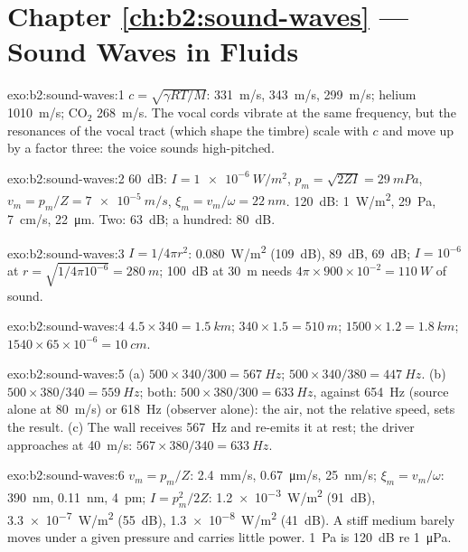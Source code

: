 \section*{Chapter \ref{ch:b2:sound-waves} --- Sound Waves in Fluids}

\begin{solution}{exo:b2:sound-waves:1}
$c = \sqrt{\gamma RT/M}$: \qty{331}{m/s}, \qty{343}{m/s}, \qty{299}{m/s}; helium
\qty{1010}{m/s}; CO$_2$ \qty{268}{m/s}. The vocal cords vibrate at the same
frequency, but the resonances of the vocal tract (which shape the
timbre) scale with $c$ and move up by a factor three: the voice sounds
high-pitched.
\end{solution}

\begin{solution}{exo:b2:sound-waves:2}
\qty{60}{dB}: $I = \qty{1e-6}{W/m^2}$, $p_m = \sqrt{2ZI} = \qty{29}{mPa}$, $v_m = p_m/Z =
\qty{7e-5}{m/s}$, $\xi_m = v_m/\omega = \qty{22}{nm}$. \qty{120}{dB}: \qty{1}{W/m^2},
\qty{29}{Pa}, \qty{7}{cm/s}, \qty{22}{\micro m}. Two: \qty{63}{dB}; a hundred: \qty{80}{dB}.
\end{solution}

\begin{solution}{exo:b2:sound-waves:3}
$I = 1/4\pi r^2$: \qty{0.080}{W/m^2} (\qty{109}{dB}), \qty{89}{dB}, \qty{69}{dB}; $I = 10^{-6}$
at $r = \sqrt{1/4\pi10^{-6}} = \qty{280}{m}$; \qty{100}{dB} at \qty{30}{m} needs $4\pi \times
900 \times 10^{-2} = \qty{110}{W}$ of sound.
\end{solution}

\begin{solution}{exo:b2:sound-waves:4}
$4.5 \times 340 = \qty{1.5}{km}$; $340 \times 1.5 = \qty{510}{m}$; $1500 \times 1.2 = \qty{1.8}{km}$;
$1540 \times 65 \times 10^{-6} = \qty{10}{cm}$.
\end{solution}

\begin{solution}{exo:b2:sound-waves:5}
(a) $500 \times 340/300 = \qty{567}{Hz}$; $500 \times 340/380 = \qty{447}{Hz}$. (b) $500 \times
380/340 = \qty{559}{Hz}$; both: $500 \times 380/300 = \qty{633}{Hz}$, against \qty{654}{Hz}
(source alone at \qty{80}{m/s}) or \qty{618}{Hz} (observer alone): the air, not
the relative speed, sets the result. (c) The wall receives \qty{567}{Hz}
and re-emits it at rest; the driver approaches at \qty{40}{m/s}: $567 \times
380/340 = \qty{633}{Hz}$.
\end{solution}

\begin{solution}{exo:b2:sound-waves:6}
$v_m = p_m/Z$: \qty{2.4}{mm/s}, \qty{0.67}{\micro m/s}, \qty{25}{nm/s}; $\xi_m = v_m/\omega$:
\qty{390}{nm}, \qty{0.11}{nm}, \qty{4}{pm}; $I = p_m^2/2Z$: \qty{1.2e-3}{W/m^2} (\qty{91}{dB}),
\qty{3.3e-7}{W/m^2} (\qty{55}{dB}), \qty{1.3e-8}{W/m^2} (\qty{41}{dB}). A stiff medium
barely moves under a given pressure and carries little power.
\qty{1}{Pa} is \qty{120}{dB} re \qty{1}{\micro Pa}.
\end{solution}


